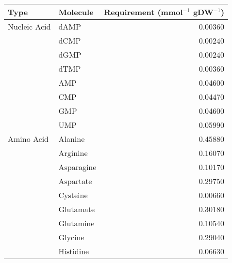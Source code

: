 \begin{table}%
  \centering
  \begin{footnotesize}
  \begin{tabular}{l l r}
                                                                                              \toprule
    Type           & Molecule                       & Requirement (mmol$^{-1}$ gDW$^{-1}$) \\ \midrule
    Nucleic Acid   & dAMP                           &  0.00360                             \\
                   & dCMP                           &  0.00240                             \\
                   & dGMP                           &  0.00240                             \\
                   & dTMP                           &  0.00360                             \\
                   & AMP                            &  0.04600                             \\
                   & CMP                            &  0.04470                             \\
                   & GMP                            &  0.04600                             \\
                   & UMP                            &  0.05990                             \\ \midrule
      Amino Acid   & Alanine                        &  0.45880                             \\
                   & Arginine                       &  0.16070                             \\
                   & Asparagine                     &  0.10170                             \\
                   & Aspartate                      &  0.29750                             \\
                   & Cysteine                       &  0.00660                             \\
                   & Glutamate                      &  0.30180                             \\
                   & Glutamine                      &  0.10540                             \\
                   & Glycine                        &  0.29040                             \\
                   & Histidine                      &  0.06630                             \\

\end{tabular}
\end{footnotesize}
\end{table}
